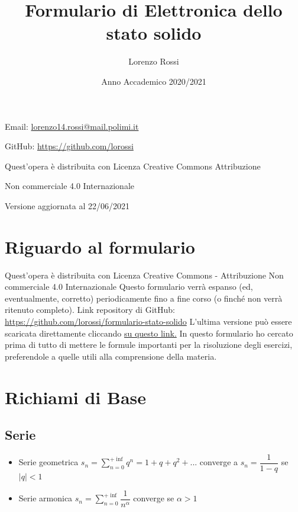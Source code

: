 \documentclass{article}
\title{\Huge Formulario di Elettronica dello stato solido}
\author{\LARGE Lorenzo Rossi}
\date{\LARGE Anno Accademico 2020/2021}
\begin{document}
\maketitle

\vspace{18em}

\large
\begin{doublespacing}\hypersetup{
    urlcolor=black,
  }
  \centerline{Email: \href{mailto://lorenzo14.rossi@mail.polimi.it}{lorenzo14.rossi@mail.polimi.it}}
  \centerline{GitHub: \url{https://github.com/lorossi}}

  \vspace{18em}
  \centerline{Quest'opera è distribuita con Licenza Creative Commons Attribuzione}
  \centerline{Non commerciale 4.0 Internazionale \ccbynceu}
  \centerline{Versione aggiornata al 22/06/2021}
\end{doublespacing}
\newpage


\tableofcontents
\clearpage
{}
\newpage

\section{Riguardo al formulario}
Quest'opera è distribuita con Licenza Creative Commons - Attribuzione Non commerciale 4.0 Internazionale \ccbynceu \newline
Questo formulario verrà espanso (ed, eventualmente, corretto) periodicamente fino a fine corso (o finché non verrà ritenuto completo). \newline
Link repository di GitHub: \url{https://github.com/lorossi/formulario-stato-solido} \newline
L'ultima versione può essere scaricata direttamente cliccando \href{https://github.com/lorossi/formulario-stato-solido/raw/master/formulario-elettronica-dello-stato-solido.pdf}{su questo link.} \newline
In questo formulario ho cercato prima di tutto di mettere le formule importanti per la risoluzione degli esercizi, preferendole a quelle utili alla comprensione della materia.

\newpage

\section{Richiami di Base}
\subsection{Serie}
\begin{itemize}
  \item Serie geometrica \( \displaystyle  s_n = \sum_{n=0}^{+\inf} q^n = 1 + q + q^2 + ... \) converge a \( s_n = \dfrac{1}{1-q} \) se \( |q| < 1 \)
  \item Serie armonica \( \displaystyle s_n = \sum_{n=0}^{+\inf} \dfrac{1}{n ^ \alpha} \) converge se \( \alpha > 1 \)
\end{itemize}
\end{document}
